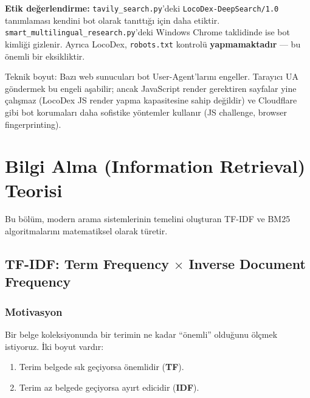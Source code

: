 \begin{dikkat}
\textbf{Etik de\u{g}erlendirme:} \texttt{tavily\_search.py}'deki \texttt{LocoDex-DeepSearch/1.0} tan{\i}mlamas{\i} kendini bot olarak tan{\i}tt{\i}\u{g}{\i} i\c{c}in daha etiktir. \texttt{smart\_multilingual\_research.py}'deki Windows Chrome taklidinde ise bot kimli\u{g}i gizlenir. Ayr{\i}ca LocoDex, \texttt{robots.txt} kontrol\"{u} \textbf{yapmamaktad{\i}r} --- bu \"{o}nemli bir eksikliktir.
\end{dikkat}

\noindent
Teknik boyut: Baz{\i} web sunucular{\i} bot User-Agent'lar{\i}n{\i} engeller. Taray{\i}c{\i} UA g\"{o}ndermek bu engeli a\c{s}abilir; ancak JavaScript render gerektiren sayfalar yine \c{c}al{\i}\c{s}maz (LocoDex JS render yapma kapasitesine sahip de\u{g}ildir) ve Cloudflare gibi bot korumalar{\i} daha sofistike y\"{o}ntemler kullan{\i}r (JS challenge, browser fingerprinting).


\section{Bilgi Alma (Information Retrieval) Teorisi}
\label{sec:ir-theory}

Bu b\"{o}l\"{u}m, modern arama sistemlerinin temelini olu\c{s}turan TF-IDF ve BM25 algoritmalar{\i}n{\i} matematiksel olarak t\"{u}retir.

\subsection{TF-IDF: Term Frequency \texorpdfstring{$\times$}{x} Inverse Document Frequency}
\label{subsec:tfidf}

\subsubsection{Motivasyon}

Bir belge koleksiyonunda bir terimin ne kadar ``\"{o}nemli'' oldu\u{g}unu \"{o}l\c{c}mek istiyoruz. \.{I}ki boyut vard{\i}r:

\begin{enumerate}
  \item Terim belgede s{\i}k ge\c{c}iyorsa \"{o}nemlidir (\textbf{TF}).
  \item Terim az belgede ge\c{c}iyorsa ay{\i}rt edicidir (\textbf{IDF}).
\end{enumerate}

